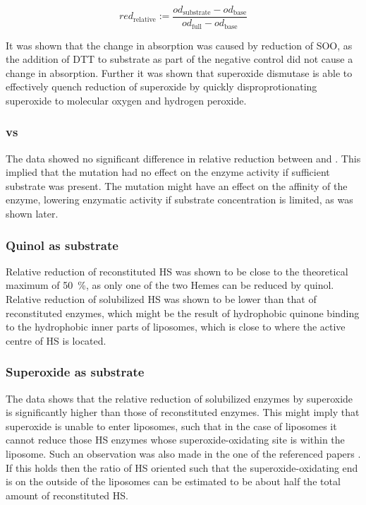 \begin{equation}
	red_{\text{relative}} := \frac{od_{\text{substrate}} -
	od_{\text{base}}}{od_{\text{full}} - od_{\text{base}}}
	\label{eq:relative_reduction}
\end{equation}

It was shown that the change in absorption was caused by reduction of SOO, as
the addition of DTT to substrate as part of the negative control did not cause
a change in absorption. Further it was shown that superoxide dismutase is able
to effectively quench reduction of superoxide by quickly disproprotionating
superoxide to molecular oxygen and hydrogen peroxide.


\subsubsection{\hs{} vs \hsmut{}}

The data showed no significant difference in relative reduction between \hs{}
and \hsmut{}. This implied that the mutation had no effect on the enzyme
activity if sufficient substrate was present. The mutation might have an effect
on the affinity of the enzyme, lowering enzymatic activity if substrate
concentration is limited, as was shown later.

\subsubsection{Quinol as substrate}

Relative reduction of reconstituted HS was shown to be close to the theoretical
maximum of \SI{50}{\percent}, as only one of the two Hemes can be reduced by
quinol. Relative reduction of solubilized HS was shown to be lower than that of
reconstituted enzymes, which might be the result of hydrophobic quinone binding
to the hydrophobic inner parts of liposomes, which is close to where the active
centre of HS is located\cite{superoxide_salvaging}.

\subsubsection{Superoxide as substrate}

The data shows that the relative reduction of solubilized enzymes by superoxide
is significantly higher than those of reconstituted enzymes. This might imply
that superoxide is unable to enter liposomes, such that in the case of
liposomes it cannot reduce those HS enzymes whose superoxide-oxidating site is
within the liposome. Such an observation was also made in the one of the
referenced papers \cite{superoxide_salvaging}. If this holds then the ratio of
HS oriented such that the superoxide-oxidating end is on the outside of the
liposomes can be estimated to be about half the total amount of reconstituted
HS.

